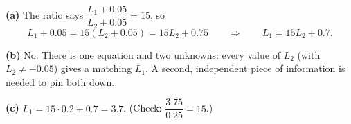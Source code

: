 \textbf{(a)} The ratio says $\dfrac{L_1+0.05}{L_2+0.05}=15$, so
\[L_1+0.05=15(L_2+0.05)=15L_2+0.75\qquad\Longrightarrow\qquad\boxed{L_1=15L_2+0.7}.\]

\textbf{(b)} No. There is one equation and two unknowns: every value of $L_2$ (with $L_2\ne-0.05$) gives a matching $L_1$. A second, independent piece of information is needed to pin both down.

\textbf{(c)} $L_1=15\cdot0.2+0.7=\boxed{3.7}$. (Check: $\dfrac{3.75}{0.25}=15$.)
